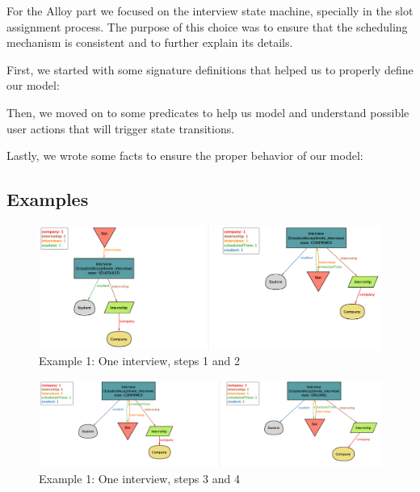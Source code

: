 For the Alloy part we focused on the interview state machine, specially in the slot assignment process. The purpose of this choice was to ensure that the scheduling mechanism is consistent and to further explain its details.

First, we started with some signature definitions that helped us to properly define our model:




Then, we moved on to some predicates to help us model and understand possible user actions that will trigger state transitions.



Lastly, we wrote some facts to ensure the proper behavior of our model:



\subsection{Examples}

\begin{figure}[h]
\centering
\includegraphics[width=\textwidth]{Images/caseOneInterview-1.png}
\caption{\label{fig:alloy-example-1-1} Example 1: One interview, steps 1 and 2}
\end{figure}

\begin{figure}[h]
\centering
\includegraphics[width=\textwidth]{Images/caseOneInterview-2.png}
\caption{\label{fig:alloy-example-1-2} Example 1: One interview, steps 3 and 4}
\end{figure}

